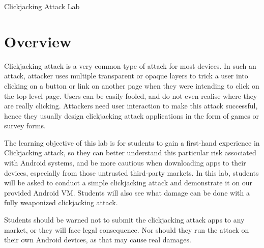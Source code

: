 



\newcommand{\clickFigs}{./Figs}





\begin{center}
{\LARGE Clickjacking Attack Lab}
\end{center}




\section{Overview}


Clickjacking attack is a very common type of attack for most devices.
In such an attack, attacker uses multiple transparent or opaque 
layers to trick a user into clicking on a button or link on another page when they 
were intending to click on the top level page. Users can be easily fooled, and do not
even realise where they are really clicking. Attackers need user interaction to make this attack 
successful, hence they usually design clickjacking attack applications in the form of games or 
survey forms.

The learning objective of this lab is for students to gain a first-hand
experience in Clickjacking attack, so they can better understand 
this particular risk associated with Android systems, and be more cautious
when downloading apps to their devices, especially from those untrusted
third-party markets. In this lab, students will be asked to conduct a simple 
clickjacking attack and demonstrate it on our provided Android VM. Students will also see 
what damage can be done with a fully weaponized clickjacking attack. 

Students should be warned not to submit the clickjacking attack apps to any market, 
or they will face legal consequence. Nor should they run the attack on their own Android devices,
as that may cause real damages.


